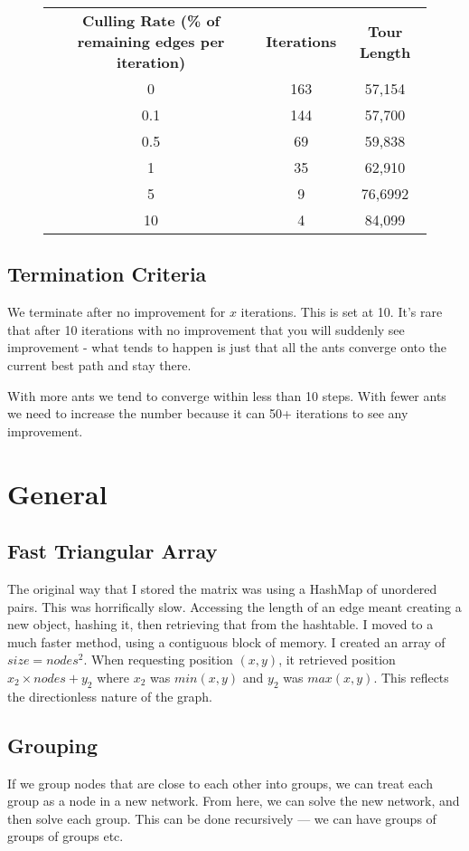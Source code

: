 \documentclass[a4paper, 11pt,table]{article}
\begin{document}
\begin{figure}
	\begin{center}
		\begin{tabu}{|c c c|}
			\textbf{Culling Rate (\% of remaining edges per iteration)} & \textbf{Iterations} & \textbf{Tour Length} \\
			0 & 163 & 57,154 \\
			0.1 & 144 & 57,700 \\
			0.5 & 69 & 59,838 \\
			1 & 35 & 62,910 \\
			5 & 9 & 76,6992 \\
			10 & 4 & 84,099 \\
		\end{tabu}
	\end{center}
\end{figure}

\subsection{Termination Criteria}
We terminate after no improvement for $x$ iterations. This is set at 10. It's rare that after 10 iterations with no improvement that you will suddenly see improvement - what tends to happen is just that all the ants converge onto the current best path and stay there.

With more ants we tend to converge within less than 10 steps. With fewer ants we need to increase the number because it can 50+ iterations to see any improvement.

\section{General}
\subsection{Fast Triangular Array}
The original way that I stored the matrix was using a HashMap of unordered pairs. This was horrifically slow. Accessing the length of an edge meant creating a new object, hashing it, then retrieving that from the hashtable. I moved to a much faster method, using a contiguous block of memory. I created an array of $size=nodes^2$. When requesting position $(x,y)$, it retrieved position $x_2 \times nodes + y_2$ where $x_2$ was $min(x,y)$ and $y_2$ was $max(x,y)$. This reflects the directionless nature of the graph.

\subsection{Grouping}
If we group nodes that are close to each other into groups, we can treat each group as a node in a new network. From here, we can solve the new network, and then solve each group. This can be done recursively --- we can have groups of groups of groups etc.
\end{document}
